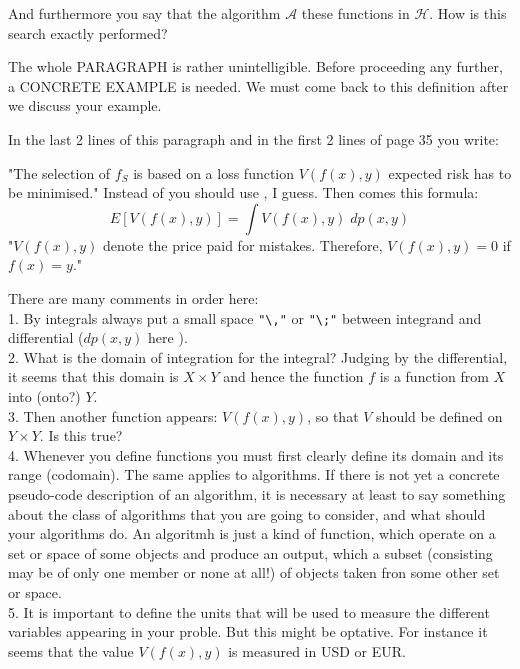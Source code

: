 \begin{description}[style=unboxed,leftmargin=0cm,itemsep=3ex]
And furthermore you say that the algorithm $\mathcal{A}$ 
these functions in $\mathcal{H}$.
How is this search exactly performed?

The whole PARAGRAPH is rather unintelligible.
Before proceeding any further, a CONCRETE EXAMPLE is needed. 
We must come back to this definition after we discuss your example.

In the last 2 lines of this paragraph and in the first 2 lines of page
35 you write:

"The selection of $f_S$ is based on a loss function $V(f(x),y)$
 expected risk has to be minimised."
Instead of  you should use , I guess.
Then comes this formula:
$$
E[V(f(x),y)] = \int V(f(x),y)\;dp(x,y)
$$
"$V(f(x),y)$ denote the price paid for mistakes. Therefore,
$V(f(x),y) = 0$ if $f(x) = y$."

There are many comments in order here:\\[1ex]

1. By integrals always put a small space \verb!"\,"! or \verb!"\;"!
between integrand and differential ($dp(x,y)$ here ).\\[1ex]

2. What is the domain of integration for the integral?
Judging by the differential, it seems that this domain is $X\times Y$
and hence the function $f$ is a function from $X$ into (onto?) $Y$.\\[1ex]

3. Then another function appears: $V(f(x),y)$, so that $V$ should be
defined on $Y\times Y$. Is this true? \\[1ex]

4. Whenever you define functions you must first clearly define its
domain and its range (codomain).
The same applies to algorithms.
If there is not yet a concrete pseudo-code description of an algorithm,
it is necessary at least to say something about the class of algorithms
that you are going to consider, and what should your algorithms do.
An algoritmh is just a kind of function, which operate on a set or
space of some objects and produce an output, which a subset (consisting
may be of only one member or none at all!) of objects taken fron some
other set or space. \\[1ex]

5. It is important to define the units that will be used to measure
the different variables appearing in your proble.
But this might be optative. For instance it seems that the value
$V(f(x),y)$ is measured in USD or EUR. \\[1ex]


\end{description}
